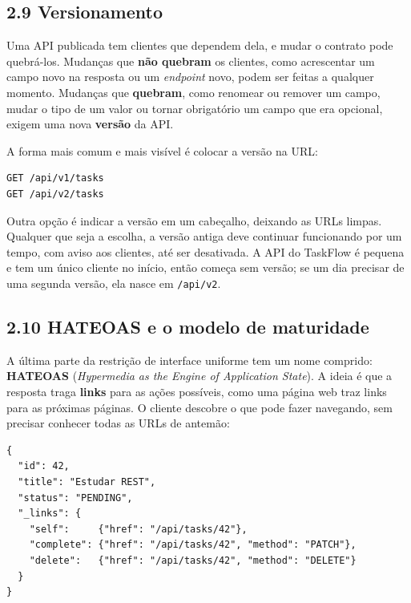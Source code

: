 \subsection{2.9 Versionamento}

Uma API publicada tem clientes que dependem dela, e mudar o contrato pode quebrá-los. Mudanças que \textbf{não quebram} os clientes, como acrescentar um campo novo na resposta ou um \textit{endpoint} novo, podem ser feitas a qualquer momento. Mudanças que \textbf{quebram}, como renomear ou remover um campo, mudar o tipo de um valor ou tornar obrigatório um campo que era opcional, exigem uma nova \textbf{versão} da API.

A forma mais comum e mais visível é colocar a versão na URL:

\begin{codigo}
\begin{Verbatim}[breaklines=true, breaksymbolleft={}, fontsize=\footnotesize]
GET /api/v1/tasks
GET /api/v2/tasks
\end{Verbatim}
\end{codigo}

Outra opção é indicar a versão em um cabeçalho, deixando as URLs limpas. Qualquer que seja a escolha, a versão antiga deve continuar funcionando por um tempo, com aviso aos clientes, até ser desativada. A API do TaskFlow é pequena e tem um único cliente no início, então começa sem versão; se um dia precisar de uma segunda versão, ela nasce em \texttt{/api/v2}.

\subsection{2.10 HATEOAS e o modelo de maturidade}

A última parte da restrição de interface uniforme tem um nome comprido: \textbf{HATEOAS} (\textit{Hypermedia as the Engine of Application State}). A ideia é que a resposta traga \textbf{links} para as ações possíveis, como uma página web traz links para as próximas páginas. O cliente descobre o que pode fazer navegando, sem precisar conhecer todas as URLs de antemão:

\begin{codigo}
\begin{Verbatim}[breaklines=true, breaksymbolleft={}, fontsize=\footnotesize]
{
  "id": 42,
  "title": "Estudar REST",
  "status": "PENDING",
  "_links": {
    "self":     {"href": "/api/tasks/42"},
    "complete": {"href": "/api/tasks/42", "method": "PATCH"},
    "delete":   {"href": "/api/tasks/42", "method": "DELETE"}
  }
}
\end{Verbatim}
\end{codigo}

